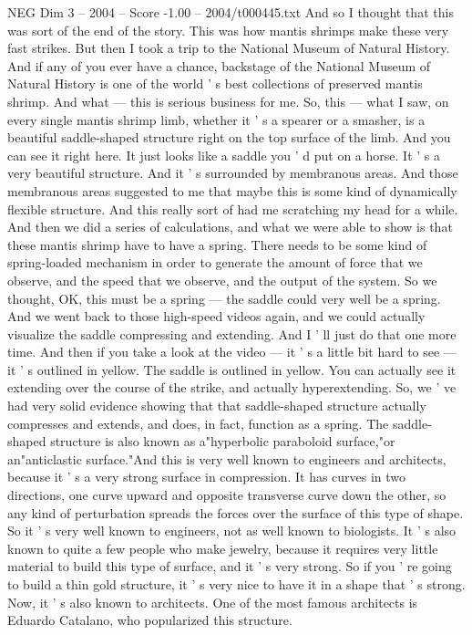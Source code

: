 \begin{textsample}{NEG Dim 3 – 2004 – Score -1.00 – 2004/t000445.txt}
And so I thought that this was sort of the end of the story.
This was how mantis shrimps make these very fast strikes.
But then I took a trip to the National Museum of Natural History.
And if any of you ever have a chance, backstage of the National Museum of Natural History is one of the world ' s best collections of preserved mantis shrimp.
And what — this is serious business for me.
So, this — what I saw, on every single mantis shrimp limb, whether it ' s a spearer or a smasher, is a beautiful saddle-shaped structure right on the top surface of the limb.
And you can see it right here.
It just looks like a saddle you ' d put on a horse.
It ' s a very beautiful structure.
And it ' s surrounded by membranous areas.
And those membranous areas suggested to me that maybe this is some kind of dynamically flexible structure.
And this really sort of had me scratching my head for a while.
And then we did a series of calculations, and what we were able to show is that these mantis shrimp have to have a spring.
There needs to be some kind of spring-loaded mechanism in order to generate the amount of force that we observe, and the speed that we observe, and the output of the system.
So we thought, OK, this must be a spring — the saddle could very well be a spring.
And we went back to those high-speed videos again, and we could actually visualize the saddle compressing and extending.
And I ' ll just do that one more time.
And then if you take a look at the video — it ' s a little bit hard to see — it ' s outlined in yellow.
The saddle is outlined in yellow.
You can actually see it extending over the course of the strike, and actually hyperextending.
So, we ' ve had very solid evidence showing that that saddle-shaped structure actually compresses and extends, and does, in fact, function as a spring.
The saddle-shaped structure is also known as a"hyperbolic paraboloid surface,"or an"anticlastic surface."And this is very well known to engineers and architects, because it ' s a very strong surface in compression.
It has curves in two directions, one curve upward and opposite transverse curve down the other, so any kind of perturbation spreads the forces over the surface of this type of shape.
So it ' s very well known to engineers, not as well known to biologists.
It ' s also known to quite a few people who make jewelry, because it requires very little material to build this type of surface, and it ' s very strong.
So if you ' re going to build a thin gold structure, it ' s very nice to have it in a shape that ' s strong.
Now, it ' s also known to architects.
One of the most famous architects is Eduardo Catalano, who popularized this structure.

\end{textsample}
